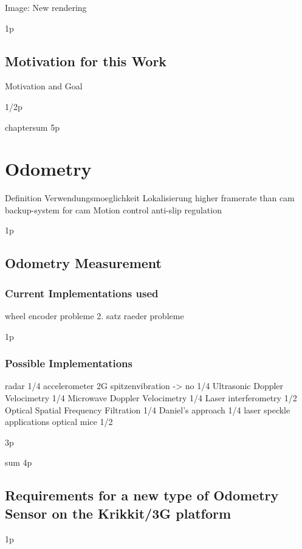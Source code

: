 \documentclass[12pt,a4paper]{article}
\begin{document}
Image: New rendering

1p

\subsection{Motivation for this Work}
    
Motivation and Goal

1/2p

chaptersum 5p

\section{Odometry}
  Definition
  Verwendungsmoeglichkeit
    Lokalisierung
      higher framerate than cam
      backup-system for cam
    Motion control
      anti-slip regulation

1p

\subsection{Odometry Measurement}

\subsubsection{Current Implementations used}

      wheel encoder
        probleme
      2. satz raeder
        probleme

1p

\subsubsection{Possible Implementations}

      radar
1/4
      accelerometer
        2G spitzenvibration -> no
1/4
      Ultrasonic Doppler Velocimetry
1/4
      Microwave Doppler Velocimetry
1/4
      Laser interferometry
1/2
      Optical Spatial Frequency Filtration
1/4
        Daniel's approach
1/4
        laser speckle applications
        optical mice
1/2

3p

sum 4p

\subsection{Requirements for a new type of Odometry Sensor on the Krikkit/3G platform}

1p
\end{document}
